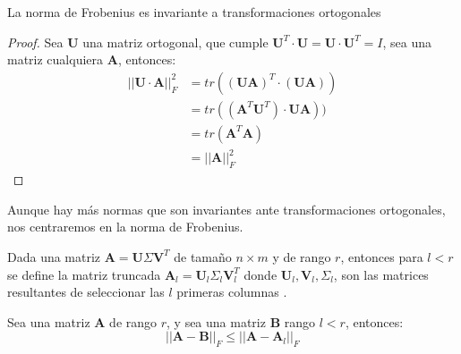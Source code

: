 \begin{propo}
La norma de Frobenius es invariante a transformaciones ortogonales
\begin{proof}
Sea $\mathbf{U}$ una matriz ortogonal, que cumple $\mathbf{U}^T\cdot \mathbf{U}=\mathbf{U}\cdot \mathbf{U}^T=I$, sea una matriz cualquiera $\mathbf{A}$, entonces:
\begin{align*}\tag{2.7}
||\mathbf{U} \cdot \mathbf{A}||_F^2&=tr((\mathbf{U} \mathbf{A})^T\cdot(\mathbf{U} \mathbf{A}))\\
&=tr((\mathbf{A}^T \mathbf{U}^T)\cdot \mathbf{U} \mathbf{A}))\\
&=tr(\mathbf{A}^T \mathbf{A})\\
&=||\mathbf{A}||_F^2
\end{align*}
\end{proof}
\end{propo}

\noindent Aunque hay más normas que son invariantes ante transformaciones ortogonales, nos centraremos en la norma de Frobenius.

\begin{defi}
Dada una matriz $\textbf{A}=\textbf{U}\Sigma \textbf{V}^T$ de tamaño $n\times m $ y de rango $r$, entonces para $l < r$ se define la matriz truncada  $\textbf{A}_l=\textbf{U}_l \Sigma_l \textbf{V}^T_l$ donde $\textbf{U}_l,\textbf{V}_l,\Sigma_l$, son las matrices resultantes de seleccionar las $l$ primeras columnas . 
\end{defi}


\begin{teorema}
Sea una matriz $\textbf{A}$ de rango $r$, y sea una matriz $\textbf{B}$ rango $l<r$, entonces:
\begin{equation}
||\textbf{A}-\textbf{B}||_F \leq ||\textbf{A}-\textbf{A}_l||_F
\end{equation}
\end{teorema}





